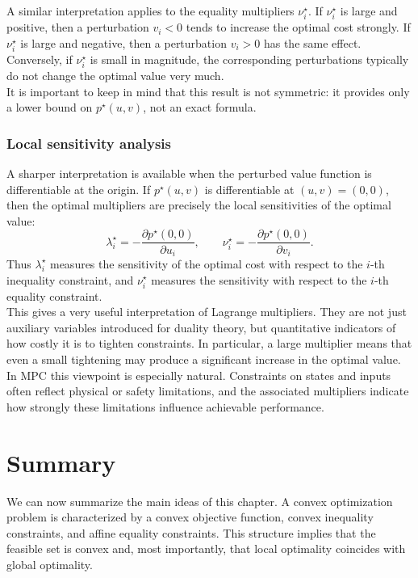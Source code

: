 A similar interpretation applies to the equality multipliers \(\nu_i^\star\). If \(\nu_i^\star\) is
large and positive, then a perturbation \(v_i<0\) tends to increase the optimal cost strongly.
If \(\nu_i^\star\) is large and negative, then a perturbation \(v_i>0\) has the same effect.
Conversely, if \(\nu_i^\star\) is small in magnitude, the corresponding perturbations typically do
not change the optimal value very much.\\

It is important to keep in mind that this result is not symmetric: it provides only a lower bound
on \(p^\star(u,v)\), not an exact formula.

\subsubsection{Local sensitivity analysis}

A sharper interpretation is available when the perturbed value function is differentiable at the
origin. If \(p^\star(u,v)\) is differentiable at \((u,v)=(0,0)\), then the optimal multipliers are
precisely the local sensitivities of the optimal value:
\[
\lambda_i^\star = -\frac{\partial p^\star(0,0)}{\partial u_i},
\qquad
\nu_i^\star = -\frac{\partial p^\star(0,0)}{\partial v_i}.
\]
Thus \(\lambda_i^\star\) measures the sensitivity of the optimal cost with respect to the
\(i\)-th inequality constraint, and \(\nu_i^\star\) measures the sensitivity with respect to the
\(i\)-th equality constraint.\\
This gives a very useful interpretation of Lagrange multipliers. They are not just auxiliary
variables introduced for duality theory, but quantitative indicators of how costly it is to tighten
constraints. In particular, a large multiplier means that even a small tightening may produce a
significant increase in the optimal value.\\

In MPC this viewpoint is especially natural. Constraints on states and inputs often reflect
physical or safety limitations, and the associated multipliers indicate how strongly these
limitations influence achievable performance.

\section{Summary}

We can now summarize the main ideas of this chapter. A convex optimization problem is
characterized by a convex objective function, convex inequality constraints, and affine equality
constraints. This structure implies that the feasible set is convex and, most importantly, that
local optimality coincides with global optimality.\\

